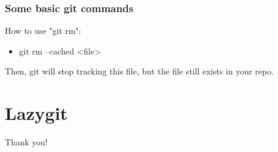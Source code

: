 \documentclass[aspectratio=169]{beamer}
\begin{document}
\begin{frame}
  \frametitle{Some basic git commands}
  How to use "git rm":
  \begin{itemize}
    \item git rm --cached <file>
  \end{itemize}
  Then, git will stop tracking this file, but the file still exists in your repo.
\end{frame}





\section{Lazygit}


\begin{frame}
  \Huge{\centerline{Thank you!}}
\end{frame}
\end{document}
